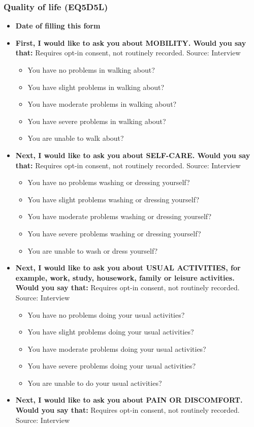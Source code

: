 \documentclass[
]{scrartcl}
\providecommand{\tightlist}{%
  \setlength{\itemsep}{0pt}\setlength{\parskip}{0pt}}\usepackage{longtable,booktabs,array}
\begin{document}
\subsubsection{Quality of life (EQ5D5L)}\label{quality-of-life-eq5d5l}

\begin{itemize}
\item
  \textbf{Date of filling this form}
\item
  \textbf{First, I would like to ask you about MOBILITY. Would you say
  that:} Requires opt-in consent, not routinely recorded. Source:
  Interview

  \begin{itemize}
  \tightlist
  \item
    You have no problems in walking about?
  \item
    You have slight problems in walking about?
  \item
    You have moderate problems in walking about?
  \item
    You have severe problems in walking about?
  \item
    You are unable to walk about?
  \end{itemize}
\item
  \textbf{Next, I would like to ask you about SELF-CARE. Would you say
  that:} Requires opt-in consent, not routinely recorded. Source:
  Interview

  \begin{itemize}
  \tightlist
  \item
    You have no problems washing or dressing yourself?
  \item
    You have slight problems washing or dressing yourself?
  \item
    You have moderate problems washing or dressing yourself?
  \item
    You have severe problems washing or dressing yourself?
  \item
    You are unable to wash or dress yourself?
  \end{itemize}
\item
  \textbf{Next, I would like to ask you about USUAL ACTIVITIES, for
  example, work, study, housework, family or leisure activities. Would
  you say that:} Requires opt-in consent, not routinely recorded.
  Source: Interview

  \begin{itemize}
  \tightlist
  \item
    You have no problems doing your usual activities?
  \item
    You have slight problems doing your usual activities?
  \item
    You have moderate problems doing your usual activities?
  \item
    You have severe problems doing your usual activities?
  \item
    You are unable to do your usual activities?
  \end{itemize}
\item
  \textbf{Next, I would like to ask you about PAIN OR DISCOMFORT. Would
  you say that:} Requires opt-in consent, not routinely recorded.
  Source: Interview


\end{itemize}
\end{document}
